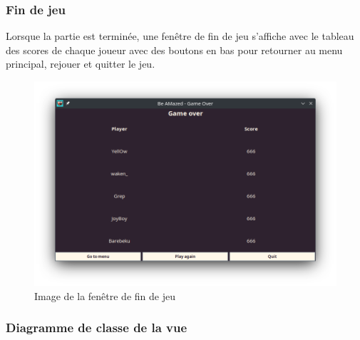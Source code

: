 \subsubsection*{Fin de jeu}

Lorsque la partie est terminée, une fenêtre de fin de jeu s'affiche avec le tableau des scores de chaque joueur avec des boutons en bas pour retourner au menu principal, rejouer et quitter le jeu.

\begin{figure}[!htb]%
    \centering
    \includegraphics[scale=0.4]{ressources/Implementation/Labyrinthe/Vue/GameOver.png}%
    \caption{Image de la fenêtre de fin de jeu}%
\end{figure}

\subsubsection*{Diagramme de classe de la vue}
